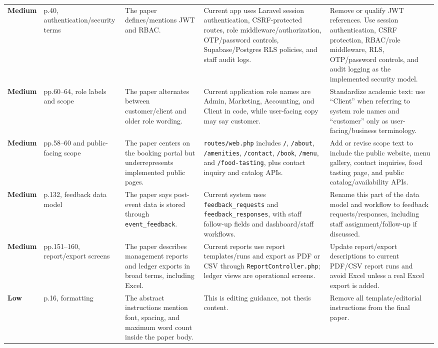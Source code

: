 \documentclass[11pt]{article}
\newcommand{\severitymedium}{\textcolor{medium}{\textbf{Medium}}}
\newcommand{\severitylow}{\textcolor{low}{\textbf{Low}}}
\begin{document}
\begin{landscape}
\begin{longtable}{L{0.72in} L{1.05in} L{2.05in} L{2.55in} L{2.55in}}
\severitymedium & p.40, authentication/security terms & The paper defines/mentions JWT and RBAC. & Current app uses Laravel session authentication, CSRF-protected routes, role middleware/authorization, OTP/password controls, Supabase/Postgres RLS policies, and staff audit logs. & Remove or qualify JWT references. Use session authentication, CSRF protection, RBAC/role middleware, RLS, OTP/password controls, and audit logging as the implemented security model. \\

\severitymedium & pp.60--64, role labels and scope & The paper alternates between customer/client and older role wording. & Current application role names are Admin, Marketing, Accounting, and Client in code, while user-facing copy may say customer. & Standardize academic text: use ``Client'' when referring to system role names and ``customer'' only as user-facing/business terminology. \\

\severitymedium & pp.58--60 and public-facing scope & The paper centers on the booking portal but underrepresents implemented public pages. & \texttt{routes/web.php} includes \texttt{/}, \texttt{/about}, \texttt{/amenities}, \texttt{/contact}, \texttt{/book}, \texttt{/menu}, and \texttt{/food-tasting}, plus contact inquiry and catalog APIs. & Add or revise scope text to include the public website, menu gallery, contact inquiries, food tasting page, and public catalog/availability APIs. \\

\severitymedium & p.132, feedback data model & The paper says post-event data is stored through \texttt{event\_feedback}. & Current system uses \texttt{feedback\_requests} and \texttt{feedback\_responses}, with staff follow-up fields and dashboard/staff workflows. & Rename this part of the data model and workflow to feedback requests/responses, including staff assignment/follow-up if discussed. \\

\severitymedium & pp.151--160, report/export screens & The paper describes management reports and ledger exports in broad terms, including Excel. & Current reports use report templates/runs and export as PDF or CSV through \texttt{ReportController.php}; ledger views are operational screens. & Update report/export descriptions to current PDF/CSV report runs and avoid Excel unless a real Excel export is added. \\

\severitylow & p.16, formatting & The abstract instructions mention font, spacing, and maximum word count inside the paper body. & This is editing guidance, not thesis content. & Remove all template/editorial instructions from the final paper. \\


\end{longtable}
\end{landscape}
\end{document}
